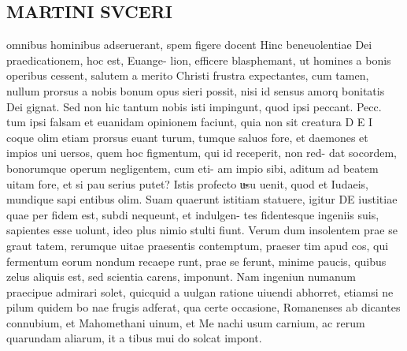 \documentclass{article}
\begin{document}
\begin{pages}
\section*{MARTINI SVCERI }\pstart omnibus hominibus adseruerant, spem figere docent Hinc beneuolentiae Dei praedicationem, hoc est, Euange- lion, efficere blasphemant, ut homines a bonis operibus cessent, salutem a merito Christi frustra expectantes, cum tamen, nullum prorsus a nobis bonum opus sieri possit, nisi id sensus amorq bonitatis Dei gignat. Sed non hic tantum nobis isti impingunt, quod ipsi peccant.  Pecc. tum ipsi falsam et euanidam opinionem faciunt, quia non sit creatura D E I coque olim etiam prorsus euant turum, tumque saluos fore, et daemones et impios uni uersos, quem hoc figmentum, qui id receperit, non red- dat socordem, bonorumque operum negligentem, cum eti- am impio sibi, aditum ad beatem uitam fore, et si pau serius putet?  \pend\pstart Istis profecto u̶su uenit, quod et Iudaeis, mundique sapi entibus olim. Suam quaerunt istitiam statuere, igitur DE iustitiae quae per fidem est, subdi nequeunt, et indulgen- tes fidentesque ingeniis suis, sapientes esse uolunt, ideo plus nimio stulti fiunt. Verum dum insolentem prae se graut tatem, rerumque uitae praesentis contemptum, praeser tim apud cos, qui fermentum eorum nondum recaepe runt, prae se ferunt, minime paucis, quibus zelus aliquis est, sed scientia carens, imponunt. Nam ingeniun numanum praecipue admirari solet, quicquid a uulgan ratione uiuendi abhorret, etiamsi ne pilum quidem bo nae frugis adferat, qua certe occasione, Romanenses ab dicantes connubium, et Mahomethani uinum, et Me nachi usum carnium, ac rerum quarundam aliarum, it  \pendQuibus   a tibus mui do solcat impont.  

\end{pages}
\end{document}
